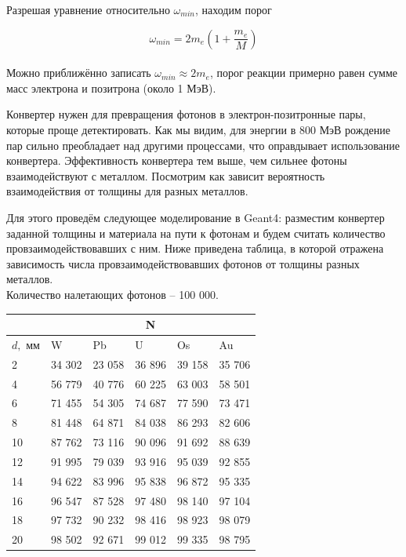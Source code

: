 \documentclass[12pt,a4paper]{article}
\begin{document}
Разрешая уравнение относительно $\omega_{min}$, находим порог

\begin{equation}
    \omega_{min} = 2m_e\left(1+\dfrac{m_e}{M}\right)
\end{equation}
\\

Можно приближённо записать $\omega_{min} \approx 2m_e$, порог реакции примерно равен сумме масс электрона и позитрона (около 1 МэВ).


Конвертер нужен для превращения фотонов в электрон-позитронные пары, которые проще детектировать. Как мы видим, для энергии в 800 МэВ рождение пар сильно преобладает над другими процессами, что оправдывает использование конвертера. Эффективность конвертера тем выше, чем сильнее фотоны взаимодействуют с металлом. Посмотрим как зависит вероятность взаимодействия от толщины для разных металлов. 

Для этого проведём следующее моделирование в Geant4: разместим конвертер заданной толщины и материала на пути к фотонам и будем считать количество провзаимодействовавших с ним. 
Ниже приведена таблица, в которой отражена зависимость числа провзаимодействовавших фотонов от толщины разных металлов.
\\
Количество налетающих фотонов -- 100 000.
\begin{table}[h]
\centering
\begin{tabular}{|l|l|l|l|l|l|}
\hline
 & \multicolumn{5}{c|}{N} \\ \hline
$d,$ мм & W & Pb & U & Os & Au \\ \hline
 2& 34 302& 23 058& 36 896& 39 158& 35 706\\ \hline
 4& 56 779& 40 776& 60 225& 63 003& 58 501\\ \hline
 6& 71 455& 54 305& 74 687& 77 590& 73 471\\ \hline
 8& 81 448& 64 871& 84 038& 86 293& 82 606\\ \hline
 10& 87 762& 73 116& 90 096& 91 692& 88 639\\ \hline
 12& 91 995& 79 039& 93 916& 95 039& 92 855\\ \hline
 14& 94 622& 83 996& 95 838& 96 872& 95 335\\ \hline
 16& 96 547& 87 528& 97 480& 98 140& 97 104\\ \hline
 18& 97 732& 90 232& 98 416& 98 923& 98 079\\ \hline
 20&98 502 & 92 671& 99 012& 99 335& 98 795\\ \hline
\end{tabular}
\end{table}
\end{document}
